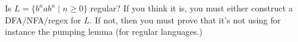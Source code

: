 Is $L = \{b^n a b^n \mid n \geq 0 \}$ regular?
If you think it is, you must either construct a DFA/NFA/regex for $L$.
If not, then you must prove that it's not using for instance the
pumping lemma (for regular languages.)
